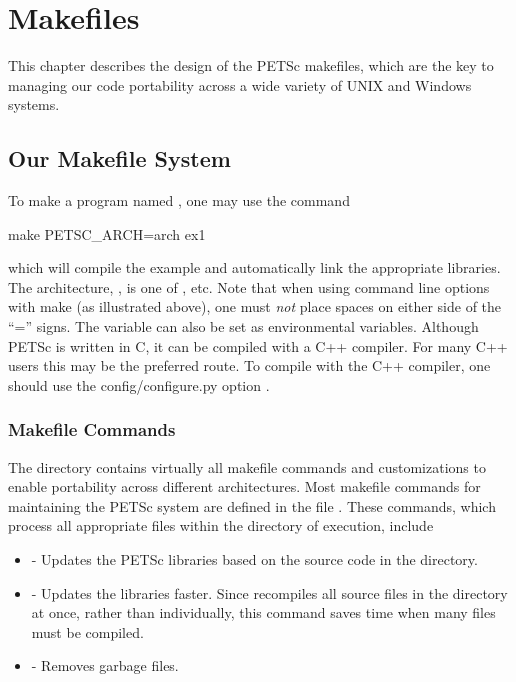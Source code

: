 {{{%
\cleardoublepage
\chapter{Makefiles}
\label{ch_makefiles}

This chapter describes the design of the PETSc makefiles, which are the
key to managing our code portability across a wide variety of UNIX and Windows systems.

\section{Our Makefile System}

To make a program named , one may use the command
\begin{tabbing}
   make PETSC\_ARCH=arch  ex1
\end{tabbing}
which will compile the 
example and automatically link the appropriate libraries.  The
architecture, , is one of , etc. Note
that when using command line options with make (as illustrated above),
one must {\em not} place spaces on either side of the ``='' signs.
The variable
 can also be set as environmental
variables.  Although PETSc is written in C, it can be compiled with a 
C++ compiler.  For many C++ users this may be the preferred route. To compile
with the C++ compiler, one should use the config/configure.py option . 

\subsection{Makefile Commands} \label{sec_common}

The directory  contains virtually all
makefile commands and customizations to enable portability across
different architectures.  Most makefile commands for maintaining the
PETSc system are defined in the file .  
These commands, which process all appropriate files within the
directory of execution, include
\begin{itemize}
\item {} - Updates the PETSc libraries based on the source code
      in the directory.
\item {} - Updates the libraries faster.  Since
       recompiles all source files in the directory at once,
      rather than individually, this command saves time when many files
      must be compiled.
\item {} - Removes garbage files.
\end{itemize}

}}}
